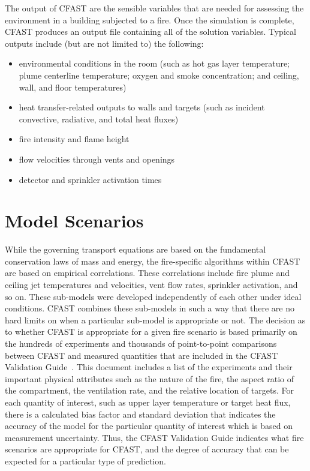 \documentclass[12pt]{book}
\begin{document}
The output of CFAST are the sensible variables that are needed for assessing the environment in a building subjected to a fire. Once the simulation is complete, CFAST produces an output file containing all of the solution variables.  Typical outputs include (but are not limited to) the following:
\begin{itemize}
\item environmental conditions in the room (such as hot gas layer temperature; plume centerline temperature; oxygen and smoke concentration; and ceiling, wall, and floor temperatures)
\item heat transfer-related outputs to walls and targets (such as incident convective, radiative, and total heat fluxes)
\item fire intensity and flame height
\item flow velocities through vents and openings
\item detector and sprinkler activation times
\end{itemize}


\section{Model Scenarios}

While the governing transport equations are based on the fundamental conservation laws of mass and energy, the fire-specific algorithms within CFAST are based on empirical correlations. These correlations include fire plume and ceiling jet temperatures and velocities, vent flow rates, sprinkler activation, and so on. These sub-models were developed independently of each other under ideal conditions. CFAST combines these sub-models in such a way that there are no hard limits on when a particular sub-model is appropriate or not. The decision as to whether CFAST is appropriate for a given fire scenario is based primarily on the hundreds of experiments and thousands of point-to-point comparisons between CFAST and measured quantities that are included in the CFAST Validation Guide~\cite{CFAST_Valid_Guide_7}. This document includes a list of the experiments and their important physical attributes such as the nature of the fire, the aspect ratio of the compartment, the ventilation rate, and the relative location of targets. For each quantity of interest, such as upper layer temperature or target heat flux, there is a calculated bias factor and standard deviation that indicates the accuracy of the model for the particular quantity of interest which is based on measurement uncertainty. Thus, the CFAST Validation Guide indicates what fire scenarios are appropriate for CFAST, and the degree of accuracy that can be expected for a particular type of prediction.
\end{document}
